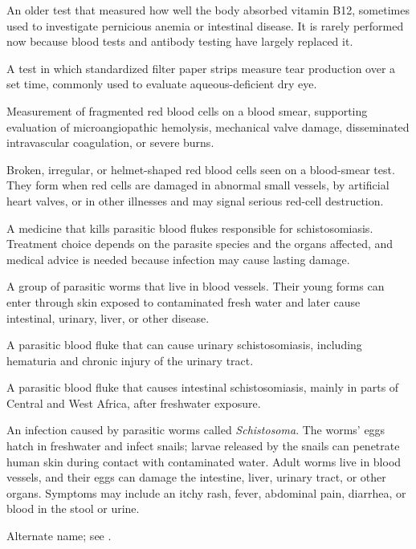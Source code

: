  An older test that measured how well the body absorbed vitamin B12, sometimes used to investigate pernicious anemia or intestinal disease. It is rarely performed now because blood tests and antibody testing have largely replaced it.

 A test in which standardized filter paper strips measure tear production over a set time, commonly used to evaluate aqueous-deficient dry eye.

 Measurement of fragmented red blood cells on a blood smear, supporting evaluation of microangiopathic hemolysis, mechanical valve damage, disseminated intravascular coagulation, or severe burns.

 Broken, irregular, or helmet-shaped red blood cells seen on a blood-smear test. They form when red cells are damaged in abnormal small vessels, by artificial heart valves, or in other illnesses and may signal serious red-cell destruction.

 A medicine that kills parasitic blood flukes responsible for schistosomiasis. Treatment choice depends on the parasite species and the organs affected, and medical advice is needed because infection may cause lasting damage.

 A group of parasitic worms that live in blood vessels. Their young forms can enter through skin exposed to contaminated fresh water and later cause intestinal, urinary, liver, or other disease.

 A parasitic blood fluke that can cause urinary schistosomiasis, including hematuria and chronic
injury of the urinary tract.

 A parasitic blood fluke that causes intestinal schistosomiasis, mainly in parts of Central and West Africa, after freshwater exposure.

 An infection caused by parasitic worms called \textit{Schistosoma}. The worms' eggs hatch in freshwater and infect snails; larvae released by the snails can penetrate human skin during contact with contaminated water. Adult worms live in blood vessels, and their eggs can damage the intestine, liver, urinary tract, or other organs. Symptoms may include an itchy rash, fever, abdominal pain, diarrhea, or blood in the stool or urine.

 Alternate name; see .

